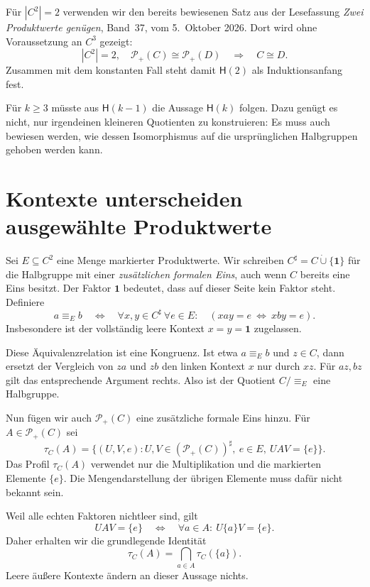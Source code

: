 \documentclass[a4paper,11pt]{article}
\newcommand{\Pp}[1]{\mathcal P_+(#1)}
\begin{document}
Für \(|C^2|=2\) verwenden wir den bereits bewiesenen Satz aus der
Lesefassung \emph{Zwei Produktwerte genügen}, Band~37, vom
5.~Oktober 2026. Dort wird ohne Voraussetzung an \(C^3\) gezeigt:
\[
 |C^2|=2,\quad \Pp C\cong\Pp D
 \quad\Longrightarrow\quad C\cong D.
\]
Zusammen mit dem konstanten Fall steht damit
\(\mathsf H(2)\) als Induktionsanfang fest.

Für \(k\ge3\) müsste aus \(\mathsf H(k-1)\) die Aussage
\(\mathsf H(k)\) folgen. Dazu genügt es nicht, nur irgendeinen
kleineren Quotienten zu konstruieren: Es muss auch bewiesen werden,
wie dessen Isomorphismus auf die ursprünglichen Halbgruppen gehoben
werden kann.

\section{Kontexte unterscheiden ausgewählte Produktwerte}

Sei \(E\subseteq C^2\) eine Menge markierter Produktwerte.
Wir schreiben \(C^\sharp=C\mathbin{\dot\cup}\{\mathbf1\}\) für die
Halbgruppe mit einer \emph{zusätzlichen formalen Eins}, auch wenn \(C\)
bereits eine Eins besitzt. Der Faktor \(\mathbf1\) bedeutet, dass auf
dieser Seite kein Faktor steht. Definiere
\begin{equation}\label{cp:point}
 a\equiv_E b
 \quad\Longleftrightarrow\quad
 \forall x,y\in C^\sharp\ \forall e\in E:
 \quad (xay=e\ \Longleftrightarrow\ xby=e).
\end{equation}
Insbesondere ist der vollständig leere Kontext \(x=y=\mathbf1\)
zugelassen.

Diese Äquivalenzrelation ist eine Kongruenz. Ist etwa \(a\equiv_E b\)
und \(z\in C\), dann ersetzt der Vergleich von \(za\) und \(zb\)
den linken Kontext \(x\) nur durch \(xz\). Für \(az,bz\) gilt das
entsprechende Argument rechts. Also ist der Quotient
\(C/{\equiv_E}\) eine Halbgruppe.

Nun fügen wir auch \(\Pp C\) eine zusätzliche formale Eins hinzu.
Für \(A\in\Pp C\) sei
\[
 \tau_C(A)=
 \bigl\{(U,V,e):
 U,V\in(\Pp C)^\sharp,\ e\in E,\ UAV=\{e\}\bigr\}.
\]
Das Profil \(\tau_C(A)\) verwendet nur die Multiplikation und die
markierten Elemente \(\{e\}\). Die Mengendarstellung der übrigen
Elemente muss dafür nicht bekannt sein.

Weil alle echten Faktoren nichtleer sind, gilt
\[
 UAV=\{e\}
 \quad\Longleftrightarrow\quad
 \forall a\in A:\ U\{a\}V=\{e\}.
\]
Daher erhalten wir die grundlegende Identität
\begin{equation}\label{cp:intersection}
 \tau_C(A)=\bigcap_{a\in A}\tau_C(\{a\}).
\end{equation}
Leere äußere Kontexte ändern an dieser Aussage nichts.
\end{document}
